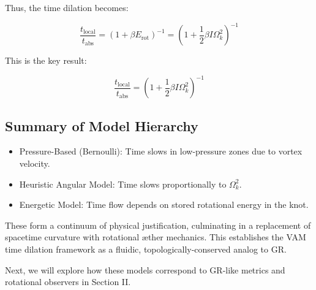 Thus, the time dilation becomes:

\begin{equation}
\frac{t_{\text{local}}}{t_{\text{abs}}} = \left(1 + \beta E_{\text{rot}} \right)^{-1} = \left(1 + \frac{1}{2} \beta I \Omega_k^2 \right)^{-1}\label{eq:time_dilation_rotational_energy}
\end{equation}

This is the key result:

\begin{equation}
    \boxed{\frac{t_{\text{local}}}{t_{\text{abs}}} = \left(1 + \frac{1}{2} \beta I \Omega_k^2 \right)^{-1}}
    \label{eq:localtime_vortex}
\end{equation}

\subsection{Summary of Model Hierarchy}

\begin{itemize}
\item Pressure-Based (Bernoulli): Time slows in low-pressure zones due to vortex velocity.
\item Heuristic Angular Model: Time slows proportionally to $\Omega_k^2$.
\item Energetic Model: Time flow depends on stored rotational energy in the knot.
\end{itemize}

These form a continuum of physical justification, culminating in a replacement of spacetime curvature with rotational æther mechanics. This establishes the VAM time dilation framework as a fluidic, topologically-conserved analog to GR.

Next, we will explore how these models correspond to GR-like metrics and rotational observers in Section II.
